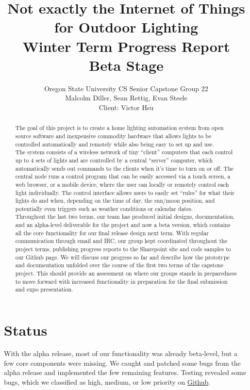 \documentclass[10pt,draftclsnofoot,onecolumn]{IEEEtran}
\title{Not exactly the Internet of Things for Outdoor Lighting\\ Winter Term Progress Report\\ Beta Stage}
\author{Oregon State University CS Senior Capstone Group 22\\Malcolm Diller, Sean Rettig, Evan Steele\\Client: Victor Hsu}
\begin{document}
\maketitle
\begin{abstract}
The goal of this project is to create a home lighting automation system from
open source software and inexpensive commodity hardware that allows lights to
be controlled automatically and remotely while also being easy to set up and
use.\\

The system consists of a wireless network of tiny ``client'' computers that
each control up to 4 sets of lights and are controlled by a central ``server''
computer, which automatically sends out commands to the clients when it's
time to turn on or off.  The central node runs a control program that can
be easily accessed via a touch screen, a web browser, or a mobile device, where
the user can locally or remotely control each light individually. The control
interface allows users to easily set ``rules'' for what their lights do and
when, depending on the time of day, the sun/moon position, and potentially even
triggers such as weather conditions or calendar dates.\\

Throughout the last two terms, our team has produced initial designs,
documentation, and an alpha-level deliverable for the project and now a
beta version, which contains all the core functionality for our
final release design next term.  With regular
communication through email and IRC, our group kept coordinated throughout the
project terms, publishing progress reports to the Sharepoint site and code samples to
our Github page. We will discuss our progress so far and describe how the
prototype and documentation unfolded over the course of the first two terms of the
capstone project. This should provide an assessment on where our groups stands
in preparedness to move forward with increased functionality in preparation for
the final submission and expo presentation.
\end{abstract}
\pagebreak
\tableofcontents
\newpage

\section{Status}
With the alpha release, most of our functionality was already beta-level,
but a few core components were missing. We caught and patched some bugs from the
alpha release and implemented the few remaining features. Testing revealed
some bugs, which we classified as high, medium, or low priority on \href{https://github.com/rettigs/cs-senior-capstone/issues}{Github}.
\end{document}
